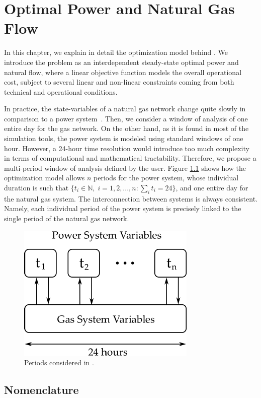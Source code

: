 \chapter{Optimal Power and Natural Gas Flow}
\label{chap:formulation}

In this chapter, we explain in detail the optimization model behind \mpng{}. We introduce the problem as an interdependent steady-state optimal power and natural flow, where a linear objective function models the overall operational cost, subject to several linear and non-linear constraints coming from both technical and operational conditions.

In practice, the state-variables of a natural gas network change quite slowly in comparison to a power system~\cite{Cui2016}. Then, we consider a window of analysis of one entire day for the gas network. On the other hand, as it is found in most of the simulation tools, the power system is modeled using standard windows of one hour. However, a 24-hour time resolution would introduce too much complexity in terms of computational and mathematical tractability. Therefore, we propose a multi-period window of analysis defined by the user. Figure \ref{fig:periods} shows how the optimization model allows $n$ periods for the power system, whose individual duration is such that $\{t_i\in \mathbb{N}, \; i=1,2,...,n : \sum_i t_i = 24\}$, and one entire day for the natural gas system. The interconnection between systems is always consistent. Namely, each individual period of the power system is precisely linked to the single period of the natural gas network.

\begin{figure}[!ht]
	\centering
	\includegraphics[scale=1.0]{Figures/Time_resolution}
	\caption{Periods considered in \mpng{}.}
	\label{fig:periods}
\end{figure}

\section*{Nomenclature}
